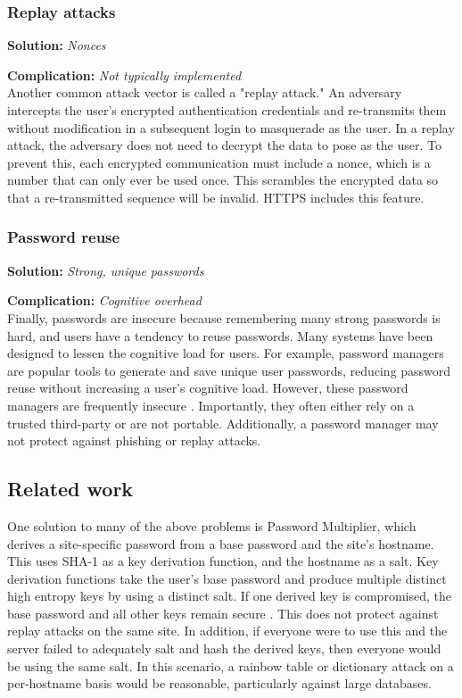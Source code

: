 \subsubsection{Replay attacks}

\textbf{Solution:} \emph{Nonces}

\noindent\textbf{Complication:} \emph{Not typically implemented}\\

\noindent Another common attack vector is called a "replay attack." An adversary intercepts the user's encrypted authentication credentials and re-transmits them without modification in a subsequent login to masquerade as the user. In a replay attack, the adversary does not need to decrypt the data to pose as the user. To prevent this, each encrypted communication must include a nonce, which is a number that can only ever be used once. This scrambles the encrypted data so that a re-transmitted sequence will be invalid. HTTPS includes this feature.

\subsubsection{Password reuse}

\textbf{Solution:} \emph{Strong, unique passwords}

\noindent\textbf{Complication:} \emph{Cognitive overhead}\\

\noindent Finally, passwords are insecure because remembering many strong passwords is hard, and users have a tendency to reuse passwords. Many systems have been designed to lessen the cognitive load for users. For example, password managers are popular tools to generate and save unique user passwords, reducing password reuse without increasing a user's cognitive load. However, these password managers are frequently insecure \cite{Li:2014}. Importantly, they often either rely on a trusted third-party or are not portable. Additionally, a password manager may not protect against phishing or replay attacks.

\subsection{Related work}

\noindent One solution to many of the above problems is Password Multiplier, which derives a site-specific password from a base password and the site's hostname. This uses SHA-1 as a key derivation function, and the hostname as a salt. Key derivation functions take the user's base password and produce multiple distinct high entropy keys by using a distinct salt. If one derived key is compromised, the base password and all other keys remain secure \cite{Halderman:2005}. This does not protect against replay attacks on the same site. In addition, if everyone were to use this and the server failed to adequately salt and hash the derived keys, then everyone would be using the same salt. In this scenario, a rainbow table or dictionary attack on a per-hostname basis would be reasonable, particularly against large databases.

